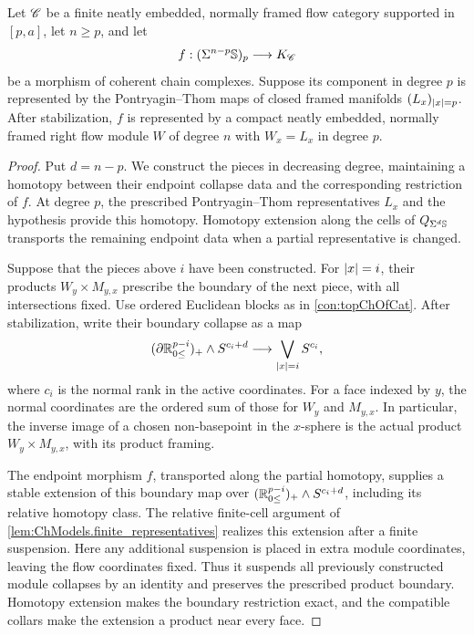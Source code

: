 \begin{lem}\label{lem:flow_relative_realization}
    Let $\mathscr{C}$ be a finite neatly embedded, normally framed flow category supported in $[p,a]$, let $n\geq p$, and let
    \[
        f:(\Sigma^{n-p}\mathbb{S})_p\longrightarrow K_{\mathscr{C}}
    \]
    be a morphism of coherent chain complexes. Suppose its component in degree $p$ is represented by the Pontryagin--Thom maps of closed framed manifolds $(L_x)_{\left\lvert x\right\rvert=p}$. After stabilization, $f$ is represented by a compact neatly embedded, normally framed right flow module $W$ of degree $n$ with $W_x=L_x$ in degree $p$.
\end{lem}
\begin{proof}
    Put $d=n-p$. We construct the pieces in decreasing degree, maintaining a homotopy between their endpoint collapse data and the corresponding restriction of $f$. At degree $p$, the prescribed Pontryagin--Thom representatives $L_x$ and the hypothesis provide this homotopy. Homotopy extension along the cells of $Q_{\Sigma^d\mathbb{S}}$ transports the remaining endpoint data when a partial representative is changed.

    Suppose that the pieces above $i$ have been constructed. For $\left\lvert x\right\rvert=i$, their products $W_y\times M_{y,x}$ prescribe the boundary of the next piece, with all intersections fixed. Use ordered Euclidean blocks as in \cref{con:topChOfCat}. After stabilization, write their boundary collapse as a map
    \[
        (\partial\mathbb{R}_{0 \leq}^{p-i})_+\wedge S^{c_i+d}
        \longrightarrow \bigvee_{\left\lvert x\right\rvert=i}S^{c_i},
    \]
    where $c_i$ is the normal rank in the active coordinates. For a face indexed by $y$, the normal coordinates are the ordered sum of those for $W_y$ and $M_{y,x}$. In particular, the inverse image of a chosen non-basepoint in the $x$-sphere is the actual product $W_y\times M_{y,x}$, with its product framing.

    The endpoint morphism $f$, transported along the partial homotopy, supplies a stable extension of this boundary map over
    $(\mathbb{R}_{0 \leq}^{p-i})_+\wedge S^{c_i+d}$, including its relative homotopy class. The relative finite-cell argument of \cref{lem:ChModels.finite_representatives} realizes this extension after a finite suspension. Here any additional suspension is placed in extra module coordinates, leaving the flow coordinates fixed. Thus it suspends all previously constructed module collapses by an identity and preserves the prescribed product boundary. Homotopy extension makes the boundary restriction exact, and the compatible collars make the extension a product near every face.


\end{proof}
